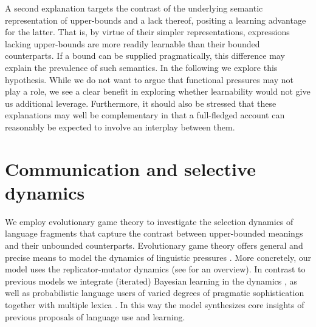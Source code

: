 \documentclass[10pt,a4paper]{article}
\begin{document}
A second explanation targets the contrast of the underlying semantic representation of upper-bounds and a lack thereof, positing a learning advantage for the latter. That is, by virtue of their simpler representations, expressions lacking upper-bounds are more readily learnable than their bounded counterparts. If a bound can be supplied pragmatically, this difference may explain the prevalence of such semantics. In the following we explore this hypothesis. While we do not want to argue that functional pressures may not play a role, we see a clear benefit in exploring whether learnability would not give us additional leverage. Furthermore, it should also be stressed that these explanations may well be complementary in that a full-fledged account can reasonably be expected to involve an interplay between them.


\section{Communication and selective dynamics}

We employ evolutionary game theory to investigate the selection dynamics of language fragments that capture the contrast between upper-bounded meanings and their unbounded counterparts. Evolutionary game theory offers general and precise means to model the dynamics of linguistic pressures \citep{nowak+krakauer:1999, huttegger+zollman:2013}. More concretely, our model uses the replicator-mutator dynamics (see \citealt{hofbauer+sigmund:2003} for an overview). In contrast to previous models we integrate (iterated) Bayesian learning in the dynamics \citep{griffiths+kalish:2007}, as well as probabilistic language users of varied degrees of pragmatic sophistication \citep{frank+goodman:2012,franke+jaeger:2014} together with multiple lexica \citep{bergen+etal:2015}. In this way the model synthesizes core insights of previous proposals of language use and learning.
\end{document}
